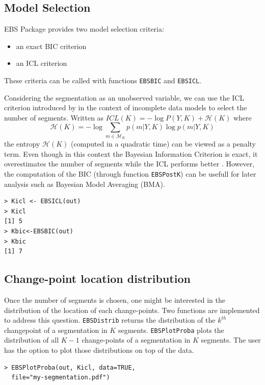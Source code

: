 \documentclass{bioinfo}
\begin{document}
\begin{methods}
\subsection{Model Selection}

EBS Package provides two model selection criteria:
\begin{itemize}
\item an exact BIC criterion
\item an ICL criterion
\end{itemize}


These criteria can be called with functions \texttt{EBSBIC} and \texttt{EBSICL}. 

Considering the segmentation as an unobserved variable, we can use the ICL criterion introduced by \cite{biernacki_assessingmixture_2000} in the context of incomplete data models to select the number of segments. Written as $ICL(K) = -\log P(Y,K) + \mathcal{H}(K) \label{ICL}$ where 
\begin{equation}
  \mathcal{H}(K)=-\log \sum_{m\in \mathcal{M}_K} p(m|Y,K) \log p(m|Y,K)
\end{equation}
the entropy $\mathcal{H}(K)$ (computed in a quadratic time) can be viewed as a penalty term. 
 Even though in this context the Bayesian Information Criterion is exact, it overestimates the number of segments while the ICL performs better \citep{rigaill_exact_2011}. However, the computation of the BIC (through function \texttt{EBSPostK}) can be usefull for later analysis such as Bayesian Model Averaging (BMA).
\begin{verbatim}
> Kicl <- EBSICL(out)
> Kicl
[1] 5
> Kbic<-EBSBIC(out)
> Kbic
[1] 7
\end{verbatim}




\subsection{Change-point location distribution}

Once the number of segments is chosen, one might be interested in the distribution of the location of each change-points. Two functions are implemented to address this question. \texttt{EBSDistrib} returns the distribution of the $k^{th}$ changepoint of a segmentation in $K$ segments. \texttt{EBSPlotProba} plots the distribution of all $K\!-\!1$ change-points of a segmentation in $K$ segments. The user has the option to plot those distributions on top of the data. 
\begin{verbatim}
> EBSPlotProba(out, Kicl, data=TRUE,
  file="my-segmentation.pdf")
\end{verbatim}


\end{methods}
\end{document}
